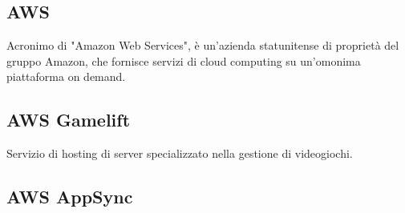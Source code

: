 	\subsection{AWS}
		Acronimo di "Amazon Web Services", è un'azienda statunitense di proprietà del gruppo Amazon, che fornisce servizi di cloud computing su un'omonima piattaforma on demand.
	\subsection{AWS Gamelift}
        Servizio di hosting di server specializzato nella gestione di videogiochi.
	\subsection{AWS AppSync}
	    
\newpage
